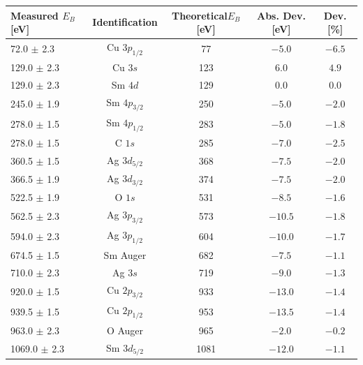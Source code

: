 \documentclass[a4paper,10pt]{scrartcl}
\begin{document}
\begin{table}[h]
\begin{center}
\begin{tabular}{lcccc}
\toprule
Measured $E_{B}$ [eV]      & Identification & Theoretical$E_{B}$ [eV] & Abs. Dev. [eV] & Dev. [\%]\\
\midrule
\phantom{00}72.0 $\pm$ 2.3 & Cu $3p_{1/2}$  & 77                      & $-5.0$         & $-6.5$   \\
\phantom{0}129.0 $\pm$ 2.3 & Cu $3s$        & 123                     & $6.0$          & $4.9$    \\
\phantom{0}129.0 $\pm$ 2.3 & Sm $4d$        & 129                     & $0.0$          & $0.0$    \\
\phantom{0}245.0 $\pm$ 1.9 & Sm $4p_{3/2}$  & 250                     & $-5.0$         & $-2.0$   \\
\phantom{0}278.0 $\pm$ 1.5 & Sm $4p_{1/2}$  & 283                     & $-5.0$         & $-1.8$   \\
\phantom{0}278.0 $\pm$ 1.5 & C $1s$         & 285                     & $-7.0$         & $-2.5$   \\
\phantom{0}360.5 $\pm$ 1.5 & Ag $3d_{5/2}$  & 368                     & $-7.5$         & $-2.0$   \\
\phantom{0}366.5 $\pm$ 1.9 & Ag $3d_{3/2}$  & 374                     & $-7.5$         & $-2.0$   \\
\phantom{0}522.5 $\pm$ 1.9 & O $1s$         & 531                     & $-8.5$         & $-1.6$   \\
\phantom{0}562.5 $\pm$ 2.3 & Ag $3p_{3/2}$  & 573                     & $-10.5$        & $-1.8$   \\
\phantom{0}594.0 $\pm$ 2.3 & Ag $3p_{1/2}$  & 604                     & $-10.0$        & $-1.7$   \\
\phantom{0}674.5 $\pm$ 1.5 & Sm Auger       & 682                     & $-7.5$         & $-1.1$   \\
\phantom{0}710.0 $\pm$ 2.3 & Ag $3s$        & 719                     & $-9.0$         & $-1.3$   \\
\phantom{0}920.0 $\pm$ 1.5 & Cu $2p_{3/2}$  & 933                     & $-13.0$        & $-1.4$   \\
\phantom{0}939.5 $\pm$ 1.5 & Cu $2p_{1/2}$  & 953                     & $-13.5$        & $-1.4$   \\
\phantom{0}963.0 $\pm$ 2.3 & O Auger        & 965                     & $-2.0$         & $-0.2$   \\
1069.0 $\pm$ 2.3           & Sm $3d_{5/2}$  & 1081                    & $-12.0$        & $-1.1$   \\

\end{tabular}
\end{center}
\end{table}
\end{document}
